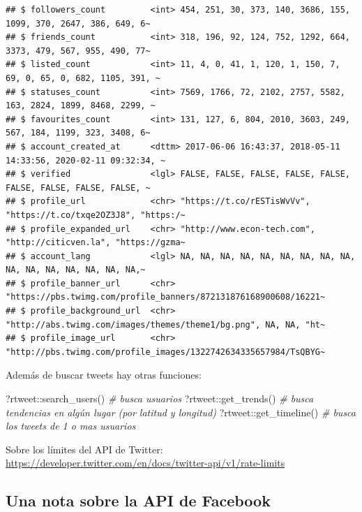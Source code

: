\documentclass[
]{book}
\newenvironment{Shaded}{\begin{snugshade}}{\end{snugshade}}
\newcommand{\CommentTok}[1]{\textcolor[rgb]{0.56,0.35,0.01}{\textit{#1}}}
\newcommand{\FunctionTok}[1]{\textcolor[rgb]{0.00,0.00,0.00}{#1}}
\newcommand{\NormalTok}[1]{#1}
\newcommand{\SpecialCharTok}[1]{\textcolor[rgb]{0.00,0.00,0.00}{#1}}
\begin{document}
\begin{verbatim}
## $ followers_count         <int> 454, 251, 30, 373, 140, 3686, 155, 1099, 370, 2647, 386, 649, 6~
## $ friends_count           <int> 318, 196, 92, 124, 752, 1292, 664, 3373, 479, 567, 955, 490, 77~
## $ listed_count            <int> 11, 4, 0, 41, 1, 120, 1, 150, 7, 69, 0, 65, 0, 682, 1105, 391, ~
## $ statuses_count          <int> 7569, 1766, 72, 2102, 2757, 5582, 163, 2824, 1899, 8468, 2299, ~
## $ favourites_count        <int> 131, 127, 6, 804, 2010, 3603, 249, 567, 184, 1199, 323, 3408, 6~
## $ account_created_at      <dttm> 2017-06-06 16:43:37, 2018-05-11 14:33:56, 2020-02-11 09:32:34, ~
## $ verified                <lgl> FALSE, FALSE, FALSE, FALSE, FALSE, FALSE, FALSE, FALSE, FALSE, ~
## $ profile_url             <chr> "https://t.co/rESTisWvVv", "https://t.co/txqe2OZ3J8", "https:/~
## $ profile_expanded_url    <chr> "http://www.econ-tech.com", "http://citicven.la", "https://gzma~
## $ account_lang            <lgl> NA, NA, NA, NA, NA, NA, NA, NA, NA, NA, NA, NA, NA, NA, NA, NA,~
## $ profile_banner_url      <chr> "https://pbs.twimg.com/profile_banners/872131876168900608/16221~
## $ profile_background_url  <chr> "http://abs.twimg.com/images/themes/theme1/bg.png", NA, NA, "ht~
## $ profile_image_url       <chr> "http://pbs.twimg.com/profile_images/1322742634335657984/TsQBYG~
\end{verbatim}

Además de buscar tweets hay otras funciones:

\begin{Shaded}
\begin{Highlighting}[]
\NormalTok{?rtweet}\SpecialCharTok{::}\FunctionTok{search\_users}\NormalTok{() }\CommentTok{\# busca usuarios}
\NormalTok{?rtweet}\SpecialCharTok{::}\FunctionTok{get\_trends}\NormalTok{()  }\CommentTok{\# busca tendencias en algún lugar (por latitud y longitud)}
\NormalTok{?rtweet}\SpecialCharTok{::}\FunctionTok{get\_timeline}\NormalTok{() }\CommentTok{\# busca los tweets de 1 o mas usuarios}
\end{Highlighting}
\end{Shaded}

Sobre los límites del API de Twitter: \url{https://developer.twitter.com/en/docs/twitter-api/v1/rate-limits}

\hypertarget{una-nota-sobre-la-api-de-facebook}{%
\subsection{Una nota sobre la API de Facebook}\label{una-nota-sobre-la-api-de-facebook}}
\end{document}
